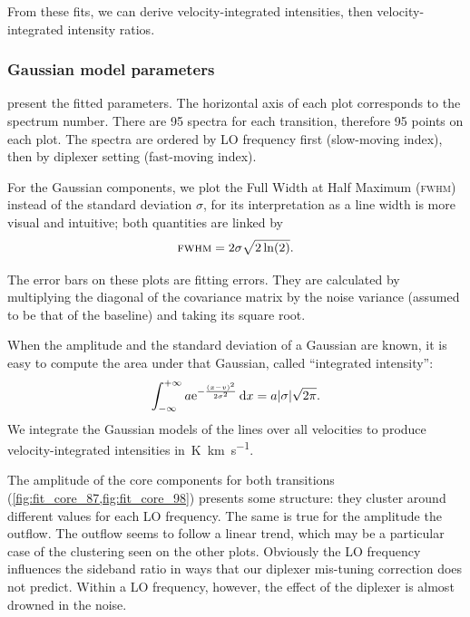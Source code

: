 From these fits, we can derive velocity-integrated intensities, then velocity-integrated intensity ratios.

\subsubsection{Gaussian model parameters}

 present the fitted parameters.
The horizontal axis of each plot corresponds to the spectrum number.
There are 95 spectra for each transition, therefore 95 points on each plot.
The spectra are ordered by LO frequency first (slow-moving index), then by diplexer setting (fast-moving index).

For the Gaussian components, we plot the Full Width at Half Maximum (\textsc{fwhm}) instead of the standard deviation $\sigma$, for its interpretation as a line width is more visual and intuitive; both quantities are linked by
\begin{equation}
    \textsc{fwhm} = 2 \sigma \sqrt{2 \ln(2)}\text{.}    \label{eq:fwhm_sigma}
\end{equation}

The error bars on these plots are fitting errors.
They are calculated by multiplying the diagonal of the covariance matrix by the noise variance (assumed to be that of the baseline) and taking its square root.

When the amplitude and the standard deviation of a Gaussian are known, it is easy to compute the area under that Gaussian, called ``integrated intensity'':
\begin{equation}
    \int_{-\infty}^{+\infty} a \mathrm{e}^{- \frac{(x-v)^2}{2 \sigma^2}}\,\mathrm{d}x
    =
    a \abs{\sigma} \sqrt{2\pi}
    \text{.}
    \label{eq:gaussian_integral}
\end{equation}
We integrate the Gaussian models of the lines over all velocities to produce velocity-integrated intensities in~\si{\kelvin \kilo\meter\per\second}.

The amplitude of the core components for both transitions (\cref{fig:fit_core_87,fig:fit_core_98}) presents some structure:
they cluster around different values for each LO frequency.
The same is true for the amplitude the~ outflow.
The  outflow seems to follow a linear trend, which may be a particular case of the clustering seen on the other plots.
Obviously the LO frequency influences the sideband ratio in ways that our diplexer mis-tuning correction does not predict.
Within a LO frequency, however, the effect of the diplexer is almost drowned in the noise.

